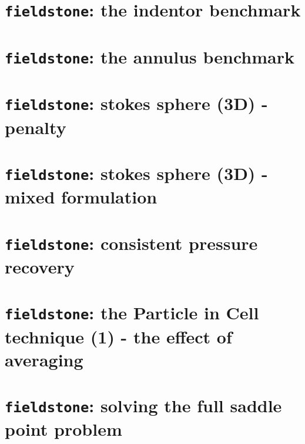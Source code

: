 \documentclass[a4paper]{article}
\begin{document}
\newpage
\section{{\tt fieldstone}: the indentor benchmark}


\newpage
\section{{\tt fieldstone}: the annulus benchmark}



\newpage
\section{{\tt fieldstone}: stokes sphere (3D) - penalty\label{f5}}


\newpage
\section{{\tt fieldstone}: stokes sphere (3D) - mixed formulation\label{f5}}


\newpage
\section{{\tt fieldstone}: consistent pressure recovery }


\newpage
\section{{\tt fieldstone}: the Particle in Cell technique (1) - the effect of averaging}


\newpage
\section{{\tt fieldstone}: solving the full saddle point problem}

\end{document}
